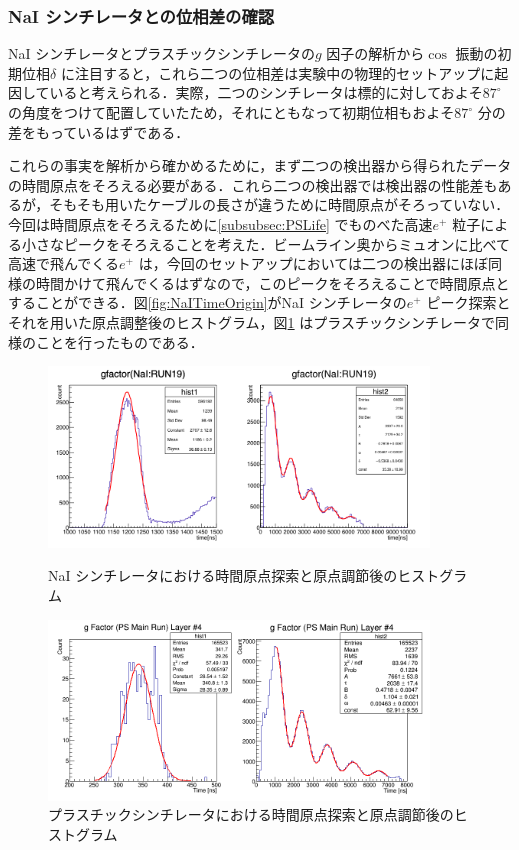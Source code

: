 \subsubsection{NaI シンチレータとの位相差の確認}
\label{subsubsec:PhaseCheck}
NaI シンチレータとプラスチックシンチレータの$g$ 因子の解析から$\cos$ 振動の初期位相$\delta$ に注目すると，これら二つの位相差は実験中の物理的セットアップに起因していると考えられる．実際，二つのシンチレータは標的に対しておよそ$87^{\circ}$ の角度をつけて配置していたため，それにともなって初期位相もおよそ$87^{\circ}$ 分の差をもっているはずである．

これらの事実を解析から確かめるために，まず二つの検出器から得られたデータの時間原点をそろえる必要がある．これら二つの検出器では検出器の性能差もあるが，そもそも用いたケーブルの長さが違うために時間原点がそろっていない．今回は時間原点をそろえるために\ref{subsubsec:PSLife} でものべた高速$e^{+}$ 粒子による小さなピークをそろえることを考えた．ビームライン奥からミュオンに比べて高速で飛んでくる$e^{+}$ は，今回のセットアップにおいては二つの検出器にほぼ同様の時間かけて飛んでくるはずなので，このピークをそろえることで時間原点とすることができる．図\ref{fig:NaITimeOrigin}がNaI シンチレータの$e^{+}$ ピーク探索とそれを用いた原点調整後のヒストグラム，図\ref{fig:PSTimeOrigin} はプラスチックシンチレータで同様のことを行ったものである．

\begin{figure}[h]
	\centering
	\includegraphics[width = 0.9\textwidth]{figure/odagawa/NaITimeOrigin.png}
	\caption{NaI シンチレータにおける時間原点探索と原点調節後のヒストグラム}
	\label{fig:NaITimeOrigin}
	\includegraphics[width = 0.9\textwidth]{figure/odagawa/PSTimeOrigin.png}
	\caption{プラスチックシンチレータにおける時間原点探索と原点調節後のヒストグラム}
	\label{fig:PSTimeOrigin}
\end{figure}

